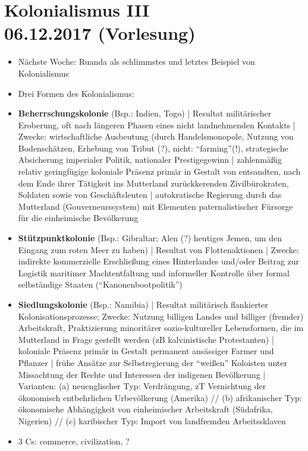 \documentclass[emulatestandardclasses]{scrartcl}
\begin{document}
\section{Kolonialismus III\\06.12.2017 (Vorlesung)}

\begin{itemize}
  \item Nächste Woche: Ruanda als schlimmstes und letztes Beispiel von Kolonialismus
  \item Drei Formen des Kolonialismus:
  \item \textbf{Beherrschungskolonie} (Bsp.: Indien, Togo) | Resultat militärischer Eroberung, oft nach längeren Phasen eines nicht landnehmenden Kontakts | Zwecke: wirtschaftliche Ausbeutung (durch Handelsmonopole, Nutzung von Bodenschätzen, Erhebung von Tribut (?), nicht: "`farming"'(!), strategische Absicherung imperialer Politik, nationaler Prestigegewinn | zahlenmäßig relativ geringfügige koloniale Präsenz primär in Gestalt von entsandten, nach dem Ende ihrer Tätigkeit ins Mutterland zurückkerenden Zivilbürokraten, Soldaten sowie von Geschäftsleuten | autokratische Regierung durch das Mutterland (Gouverneurssystem) mit Elementen paternalistischer Fürsorge für die einheimische Bevölkerung
  \item \textbf{Stützpunktkolonie} (Bsp.: Gibraltar; Alen (?) heutiges Jemen, um den Eingang zum roten Meer zu haben) | Resultat von Flottenaktionen | Zwecke: indirekte kommerzielle Erschließung eines Hinterlandes und/oder Beitrag zur Logistik maritimer Machtentfaltung und informeller Kontrolle über formal selbständige Staaten ("`Kanonenbootpolitik"')
  \item \textbf{Siedlungskolonie} (Bsp.: Namibia) | Resultat militärisch flankierter Kolonisationsprozesse; Zwecke: Nutzung billigen Landes und billiger (fremder) Arbeitskraft, Praktizierung minoritärer sozio-kultureller Lebensformen, die im Mutterland in Frage gestellt werden (zB kalvinistische Protestanten) | koloniale Präsenz primär in Gestalt permanent ansässiger Farmer und Pflanzer | frühe Ansätze zur Selbstregierung der "`weißen"' Koloisten unter Missachtung der Rechte und Interessen der indigenen Bevölkerung | Varianten: (a) neuenglischer Typ: Verdrängung, zT Vernichtung der ökonomisch entbehrlichen Urbevölkerung (Amerika) // (b) afrikanischer Typ: ökonomische Abhängigkeit von einheimischer Arbeitskraft (Südafrika, Nigerien) // (c) karibischer Typ: Import von landfremden Arbeitssklaven
  \item 3 Cs: commerce, civilization, ?

\end{itemize}
\end{document}
